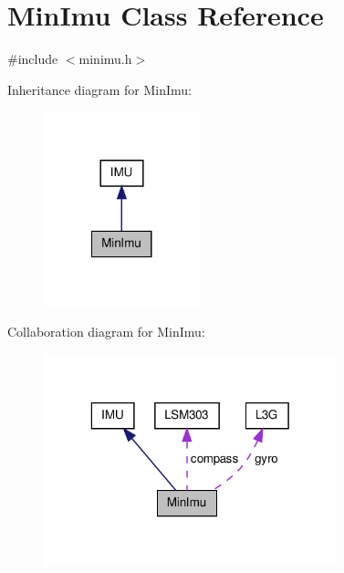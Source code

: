 \hypertarget{class_min_imu}{\section{\-Min\-Imu \-Class \-Reference}
\label{class_min_imu}
}


{\ttfamily \#include $<$minimu.\-h$>$}



\-Inheritance diagram for \-Min\-Imu\-:
\nopagebreak
\begin{figure}[H]
\begin{center}
\leavevmode
\includegraphics[width=128pt]{class_min_imu__inherit__graph}
\end{center}
\end{figure}


\-Collaboration diagram for \-Min\-Imu\-:
\nopagebreak
\begin{figure}[H]
\begin{center}
\leavevmode
\includegraphics[width=241pt]{class_min_imu__coll__graph}
\end{center}
\end{figure}
